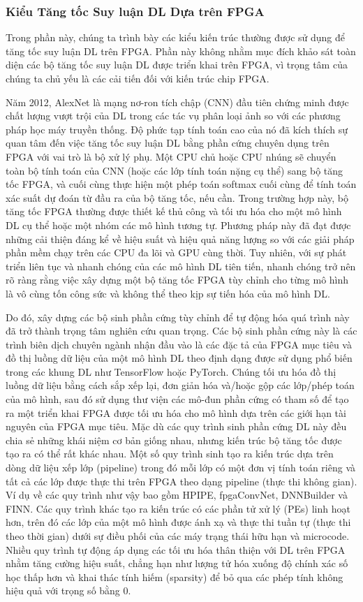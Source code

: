 \documentclass[a4paper]{article}
\begin{document}
\subsubsection{Kiểu Tăng tốc Suy luận DL Dựa trên FPGA}
    Trong phần này, chúng ta trình bày các kiểu kiến trúc thường được sử dụng để tăng tốc suy luận DL trên FPGA. Phần này không nhằm mục đích khảo sát toàn diện các bộ tăng tốc suy luận DL được triển khai trên FPGA, vì trọng tâm của chúng ta chủ yếu là các cải tiến đối với kiến trúc chip FPGA.
    
    Năm 2012, AlexNet là mạng nơ-ron tích chập (CNN) đầu tiên chứng minh được chất lượng vượt trội của DL trong các tác vụ phân loại ảnh so với các phương pháp học máy truyền thống. Độ phức tạp tính toán cao của nó đã kích thích sự quan tâm đến việc tăng tốc suy luận DL bằng phần cứng chuyên dụng trên FPGA với vai trò là bộ xử lý phụ. Một CPU chủ hoặc CPU nhúng sẽ chuyển toàn bộ tính toán của CNN (hoặc các lớp tính toán nặng cụ thể) sang bộ tăng tốc FPGA, và cuối cùng thực hiện một phép toán softmax cuối cùng để tính toán xác suất dự đoán từ đầu ra của bộ tăng tốc, nếu cần. Trong trường hợp này, bộ tăng tốc FPGA thường được thiết kế thủ công và tối ưu hóa cho một mô hình DL cụ thể hoặc một nhóm các mô hình tương tự. Phương pháp này đã đạt được những cải thiện đáng kể về hiệu suất và hiệu quả năng lượng so với các giải pháp phần mềm chạy trên các CPU đa lõi và GPU cùng thời. Tuy nhiên, với sự phát triển liên tục và nhanh chóng của các mô hình DL tiên tiến, nhanh chóng trở nên rõ ràng rằng việc xây dựng một bộ tăng tốc FPGA tùy chỉnh cho từng mô hình là vô cùng tốn công sức và không thể theo kịp sự tiến hóa của mô hình DL.
    
    Do đó, xây dựng các bộ sinh phần cứng tùy chỉnh để tự động hóa quá trình này đã trở thành trọng tâm nghiên cứu quan trọng. Các bộ sinh phần cứng này là các trình biên dịch chuyên ngành nhận đầu vào là các đặc tả của FPGA mục tiêu và đồ thị luồng dữ liệu của một mô hình DL theo định dạng được sử dụng phổ biến trong các khung DL như TensorFlow hoặc PyTorch. Chúng tối ưu hóa đồ thị luồng dữ liệu bằng cách sắp xếp lại, đơn giản hóa và/hoặc gộp các lớp/phép toán của mô hình, sau đó sử dụng thư viện các mô-đun phần cứng có tham số để tạo ra một triển khai FPGA được tối ưu hóa cho mô hình dựa trên các giới hạn tài nguyên của FPGA mục tiêu. Mặc dù các quy trình sinh phần cứng DL này đều chia sẻ những khái niệm cơ bản giống nhau, nhưng kiến trúc bộ tăng tốc được tạo ra có thể rất khác nhau. Một số quy trình sinh tạo ra kiến trúc dựa trên dòng dữ liệu xếp lớp (pipeline) trong đó mỗi lớp có một đơn vị tính toán riêng và tất cả các lớp được thực thi trên FPGA theo dạng pipeline (thực thi không gian). Ví dụ về các quy trình như vậy bao gồm HPIPE, fpgaConvNet, DNNBuilder và FINN. Các quy trình khác tạo ra kiến trúc có các phần tử xử lý (PEs) linh hoạt hơn, trên đó các lớp của một mô hình được ánh xạ và thực thi tuần tự (thực thi theo thời gian) dưới sự điều phối của các máy trạng thái hữu hạn và microcode. Nhiều quy trình tự động áp dụng các tối ưu hóa thân thiện với DL trên FPGA nhằm tăng cường hiệu suất, chẳng hạn như lượng tử hóa xuống độ chính xác số học thấp hơn và khai thác tính hiếm (sparsity) để bỏ qua các phép tính không hiệu quả với trọng số bằng 0.
\end{document}

